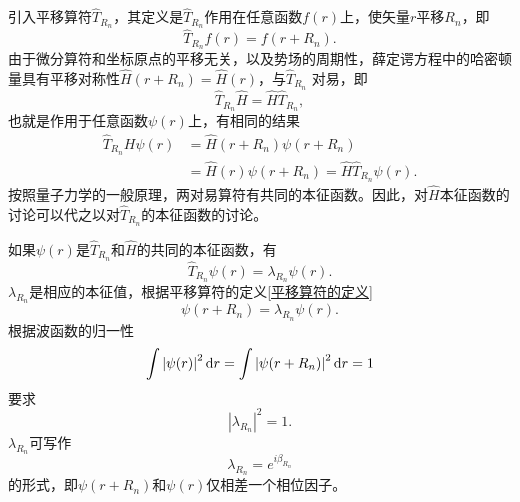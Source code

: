             引入平移算符$\hat{T}_{R_n}$，其定义是$\hat{T}_{R_n}$作用在任意函数$f(r)$上，使矢量$r$平移$R_n$，即
            \begin{equation}
                \hat{T}_{R_n}f(r)=f(r+R_n)\label{平移算符的定义}.
            \end{equation}
            由于微分算符和坐标原点的平移无关，以及势场的周期性，薛定谔方程中的哈密顿量具有平移对称性$\hat{H}(r+R_n)=\hat{H}(r)$，与$\hat{T}_{R_n}$
            对易，即
            \begin{equation}
                \hat{T}_{R_n}\hat{H}=\hat{H}\hat{T}_{R_n},
            \end{equation}
            也就是作用于任意函数$\psi(r)$上，有相同的结果
            \begin{equation}
                \begin{split}
                    \hat{T}_{R_n}H\psi(r)&=\hat{H}(r+R_n)\psi(r+R_n)\\
                    &=\hat{H}(r)\psi(r+R_n)=\hat{H}\hat{T}_{R_n}\psi(r).
                \end{split}
            \end{equation}
            按照量子力学的一般原理，两对易算符有共同的本征函数。因此，对$\hat{H}$本征函数的讨论可以代之以对$\hat{T}_{R_n}$的本征函数的讨论。

            如果$\psi(r)$是$\hat{T}_{R_n}$和$\hat{H}$的共同的本征函数，有
            \begin{equation}
                \hat{T}_{R_n}\psi(r)=\lambda_{R_n}\psi(r)\label{平移算符本征方程}.
            \end{equation}
            $\lambda_{R_n}$是相应的本征值，根据平移算符的定义\autoref{平移算符的定义}
            \begin{equation}
                \psi(r+R_n)=\lambda_{R_n}\psi(r).
            \end{equation}
            根据波函数的归一性
            \begin{equation}
                \int\left|\psi(r)\right|^2\mathop{}\!\mathrm{d} r=\int\left|\psi(r+R_n)\right|^2\mathop{}\!\mathrm{d} r=1
            \end{equation}
            要求
            \begin{equation}
                \left|\lambda_{R_n}\right|^2=1.
            \end{equation}
            $\lambda_{R_n}$可写作
            \begin{equation}
                \lambda_{R_n}=e^{i\beta_{R_n}}\label{平移算符本征值}
            \end{equation}
            的形式，即$\psi(r+R_n)$和$\psi(r)$仅相差一个相位因子。


